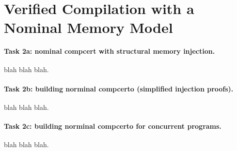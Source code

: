 \section{Verified Compilation with a Nominal Memory Model}


\paragraph*{Task 2a: nominal compcert with structural memory injection.}
blah blah blah.

\paragraph*{Task 2b: building norminal compcerto (simplified injection proofs).}
blah blah blah.

\paragraph*{Task 2c: building norminal compcerto for concurrent programs.}
blah blah blah.

